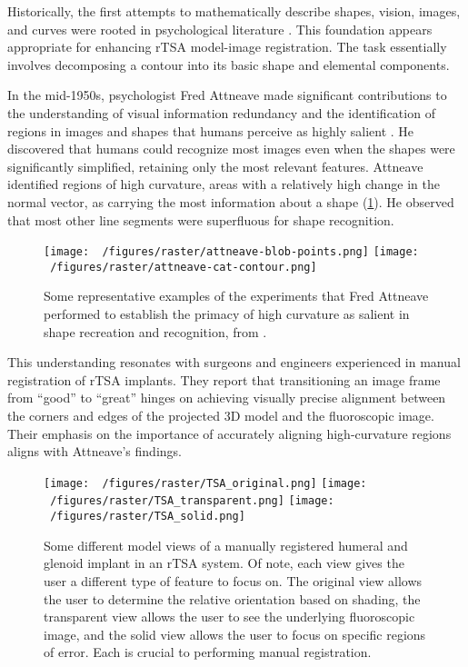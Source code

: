 Historically, the first attempts to mathematically describe shapes, vision, images, and curves were rooted in psychological literature \cite{attneaveInformationalAspectsVisual1954,attneaveQuantitativeStudyShape1956,koenderinkStructureImages1984,koenderinkSurfaceShapeCurvature1992}.
This foundation appears appropriate for enhancing rTSA model-image registration.
The task essentially involves decomposing a contour into its basic shape and elemental components.

In the mid-1950s, psychologist Fred Attneave made significant contributions to the understanding of visual information redundancy and the identification of regions in images and shapes that humans perceive as highly salient \cite{attneaveQuantitativeStudyShape1956,attneaveInformationalAspectsVisual1954}.
He discovered that humans could recognize most images even when the shapes were significantly simplified, retaining only the most relevant features.
Attneave identified regions of high curvature, areas with a relatively high change in the normal vector, as carrying the most information about a shape (\cref{fig:attneave}).
He observed that most other line segments were superfluous for shape recognition.


\begin{figure}[h!]
  \centering
  \texttt{[image: ~/figures/raster/attneave-blob-points.png]}
  \texttt{[image: ~/figures/raster/attneave-cat-contour.png]}
  \caption{Some representative examples of the experiments that Fred Attneave performed to establish the primacy of high curvature as salient in shape recreation and recognition, from \cite{attneaveInformationalAspectsVisual1954}.}
  \label{fig:attneave}
\end{figure}

This understanding resonates with surgeons and engineers experienced in manual registration of rTSA implants.
They report that transitioning an image frame from “good” to “great” hinges on achieving visually precise alignment between the corners and edges of the projected 3D model and the fluoroscopic image.
Their emphasis on the importance of accurately aligning high-curvature regions aligns with Attneave's findings.


\begin{figure}[h!]
  \centering
  \texttt{[image: ~/figures/raster/TSA\_original.png]}
  \texttt{[image: ~/figures/raster/TSA\_transparent.png]}
  \texttt{[image: ~/figures/raster/TSA\_solid.png]}
  \caption[Some different model views of a manually registered humeral and glenoid implant in an rTSA system]{Some different model views of a manually registered humeral and glenoid implant in an rTSA system. Of note, each view gives the user a different type of feature to focus on. The original view allows the user to determine the relative orientation based on shading, the transparent view allows the user to see the underlying fluoroscopic image, and the solid view allows the user to focus on specific regions of error. Each is crucial to performing manual registration.}
  \label{fig:TSA-multiview}
\end{figure}

